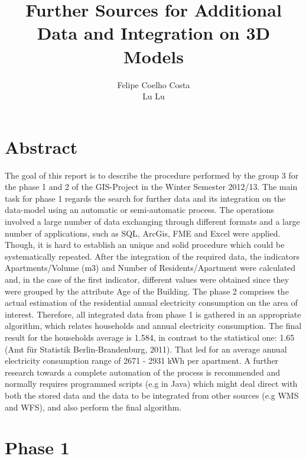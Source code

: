 \documentclass[11pt]{article}
\title{Further Sources for Additional Data and Integration on 3D Models }
\author{Felipe Coelho Costa \\ Lu Lu }
\begin{document}
\maketitle

\pagebreak

\tableofcontents
\pagebreak
\listoftables
\listoffigures
\pagebreak
\section{Abstract}
The goal of this report is to describe the procedure performed by the group 3 for the phase 1 and 2 of the GIS-Project in the Winter Semester 2012/13.
The main task for phase 1 regards the search for further data and its integration on the data-model using an automatic or semi-automatic process. The operations involved a large number of data exchanging through different formats and a large number of  applications, such as SQL, ArcGis, FME and Excel were applied. Though, it is hard to establish an unique and solid procedure which could be systematically repeated.
After the integration of the required data, the indicators Apartments/Volume (m3) and Number of Residents/Apartment were calculated and, in the case of the first indicator, different values were obtained since they were grouped by the attribute Age of the Building.
The phase 2 comprises the actual estimation of the residential annual electricity consumption on the area of interest. Therefore, all integrated data from phase 1 is gathered in an appropriate algorithm, which relates households and annual electricity consumption.
The final result for the households average is 1.584, in contrast to the statistical one: 1.65 (Amt für Statistik Berlin-Brandenburg, 2011). That led for an average annual electricity consumption range of 2671 - 2931 kWh per apartment.
A further research towards a complete automation of the process is recommended and normally requires programmed scripts (e.g in Java) which might deal direct with both the stored data and the data to be integrated from other sources (e.g WMS and WFS), and also perform the final algorithm.
\section{Phase 1}
\end{document}

